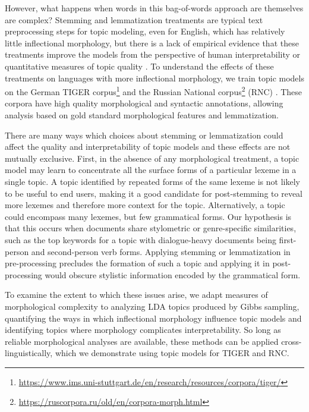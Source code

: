\documentclass[11pt,a4paper]{article}
\begin{document}
However, what happens when words in this bag-of-words approach are themselves are complex? Stemming and lemmatization treatments are typical text preprocessing steps for topic modeling, even for English, which has relatively little inflectional morphology, but there is a lack of empirical evidence that these treatments improve the models from the perspective of human interpretability or quantitative measures of topic quality \cite{schofield-mimno-2016-comparing}. To understand the effects of these treatments on languages with more inflectional morphology, we train topic models on the German TIGER corpus\footnote{\url{https://www.ims.uni-stuttgart.de/en/research/resources/corpora/tiger/}} \cite{Brants2004TIGERLI} and the Russian National corpus\footnote{\url{https://ruscorpora.ru/old/en/corpora-morph.html}} (RNC) \cite{Apresjan2006ASA}. These corpora have high quality morphological and syntactic annotations, allowing analysis based on gold standard morphological features and lemmatization.

There are many ways which choices about stemming or lemmatization could affect the quality and interpretability of topic models and these effects are not mutually exclusive. First, in the absence of any morphological treatment, a topic model may learn to concentrate all the surface forms of a particular lexeme in a single topic. A topic identified by repeated forms of the same lexeme is not likely to be useful to end users, making it a good candidate for post-stemming to reveal more lexemes and therefore more context for the topic. Alternatively, a topic could encompass many lexemes, but few grammatical forms. Our hypothesis is that this occurs when documents share stylometric or genre-specific similarities, such as the top keywords for a topic with dialogue-heavy documents being first-person and second-person verb forms. Applying stemming or lemmatization in pre-processing precludes the formation of such a topic and applying it in post-processing would obscure stylistic information encoded by the grammatical form.

To examine the extent to which these issues arise, we adapt measures of morphological complexity to analyzing LDA topics produced by Gibbs sampling, quantifying the ways in which inflectional morphology influence topic models and identifying topics where morphology complicates interpretability. So long as reliable morphological analyses are available, these methods can be applied cross-linguistically, which we demonstrate using topic models for TIGER and RNC.
\end{document}
